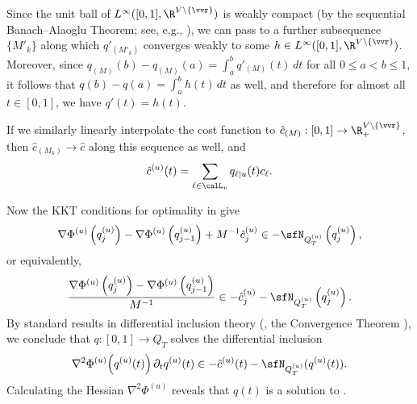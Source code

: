 Since the unit ball of $L^{\infty}([0,1], \R^{V \setminus \{\vvr\}})$ is weakly compact (by
the sequential Banach--Alaoglu Theorem; see, e.g., \cite[Thm. 0.3.3]{AC84}), we can pass to a further subsequence $\{M'_{k}\}$ along which %
$q'_{(M'_k)}$ converges weakly to some $h \in L^{\infty}([0,1], \R^{V \setminus \{\vvr\}})$.
Moreover,
since $q_{(M)}(b)-q_{(M)}(a) = \int_a^b q'_{(M)}(t)\,dt$ for all $0 \leq a < b \leq 1$, it follows that
$q(b)-q(a) = \int_a^b h(t)\,dt$ as well, and therefore
for almost all $t \in [0,1]$, we have $q'(t) = h(t)$.

If we similarly linearly interpolate the cost function to $\hat{c}_{(M)} : [0,1] \to \R_+^{V \setminus \{\vvr\}}$,
then $\hat{c}_{(M_k)} \to \hat{c}$ along this sequence as well,
and
\[
\hat{c}^{(u)}(t) = \sum_{\ell \in \calL_v} q_{\ell \mid u}(t) c_{\ell}.
\]

Now the KKT conditions for optimality in  give
\[
\nabla \Phi^{(u)}\left(q_j^{(u)}\right) - \nabla \Phi^{(u)}\left(q_{j-1}^{(u)}\right) + M^{-1} \hat{c}^{(u)}_j \in - \sfN_{Q_T^{(u)}}\left(q_j^{(u)}\right),
\]
or equivalently,
\[
\frac{\nabla \Phi^{(u)}\left(q_j^{(u)}\right) - \nabla \Phi^{(u)}\left(q_{j-1}^{(u)}\right)}{M^{-1}} \in -\hat{c}^{(u)}_j - \sfN_{Q_T^{(u)}}\left(q_j^{(u)}\right).
\]
By standard results in differential inclusion theory (\eg, the Convergence Theorem \cite[Thm. 1.4.1]{AC84}),
we conclude that $q : [0,1] \to Q_T$ solves the differential inclusion
\[
\nabla^2 \Phi^{(u)}\!\left(q^{(u)}(t)\right) \partial_t q^{(u)}(t) \in -\hat{c}^{(u)}(t) - \sfN_{Q_T^{(u)}}(q^{(u)}(t)).
\]
Calculating the Hessian $\nabla^2 \Phi^{(u)}$ reveals that $q(t)$ is a solution to .



